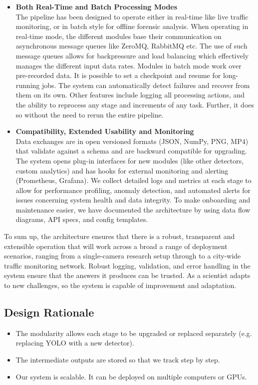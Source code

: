 \documentclass[12pt,a4paper]{report}
\theoremstyle{definition}
\theoremstyle{remark}
\begin{document}
\begin{itemize}
\item \textbf{Both Real-Time and Batch Processing Modes}\\
The pipeline has been designed to operate either in real-time like live traffic monitoring, or in batch style for offline forensic analysis. When operating in real-time mode, the different modules base their communication on asynchronous message queues like ZeroMQ, RabbitMQ etc. The use of such message queues allows for backpressure and load balancing which effectively manages the different input data rates. Modules in batch mode work over pre-recorded data. It is possible to set a checkpoint and resume for long-running jobs. The system can automatically detect failures and recover from them on its own. Other features include logging all processing actions, and the ability to reprocess any stage and increments of any task. Further, it does so without the need to rerun the entire pipeline. 

\item \textbf{Compatibility, Extended Usability and Monitoring}\\
Data exchanges are in open versioned formats (JSON, NumPy, PNG, MP4) that validate against a schema and are backward compatible for upgrading. The system opens plug-in interfaces for new modules (like other detectors, custom analytics) and has hooks for external monitoring and alerting (Prometheus, Grafana). We collect detailed logs and metrics at each stage to allow for performance profiling, anomaly detection, and automated alerts for issues concerning system health and data integrity. To make onboarding and maintenance easier, we have documented the architecture by using data flow diagrams, API specs, and config templates.
\end{itemize}

To sum up, the architecture ensures that there is a robust, transparent and extensible operation that will work across a broad a range of deployment scenarios, ranging from a single-camera research setup through to a city-wide traffic monitoring network. Robust logging, validation, and error handling in the system ensure that the answers it produces can be trusted. As a scientist adapts to new challenges, so the system is capable of improvement and adaptation. 

\subsection{Design Rationale}
\begin{itemize}
    \item The modularity allows each stage to be upgraded or replaced separately (e.g. replacing YOLO with a new detector).
    \item The intermediate outputs are stored so that we track step by step.
    \item Our system is scalable. It can be deployed on multiple computers or GPUs.
\end{itemize}
\end{document}

